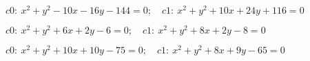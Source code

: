 \begin{esercizio}
\begin{enumeratea}
  \item  \(c0:~x^2 + y^2 -10x -16y -144 = 0; \quad c1:~x^2 + y^2 +10x +24y 
+116 = 
0\)\\
  \makebox[\linewidth][r]
   {[\(ar:~y = -\frac{1}{2} x -\frac{13}{2};~A \left (-3;~-5 \right 
);~B \left (-\frac{31}{5};~-\frac{3}{5} \right )\)]}
  \item  \(c0:~x^2 + y^2 +6x +2y -6 = 0; \quad c1:~x^2 + y^2 +8x +2y -8 = 
0\)\\
  \makebox[\linewidth][r]
   {[\(ar:~x = 1;~A \left (1;~-1 \right )\)]}
  \item  \(c0:~x^2 + y^2 +10x +10y -75 = 0; \quad c1:~x^2 + y^2 +8x +9y -65 
= 
0\)\\
  \makebox[\linewidth][r]
   {[\(ar:~y = -2 x +10;~A \left (5;~0 \right )\)]}

\end{enumeratea}
\end{esercizio}

